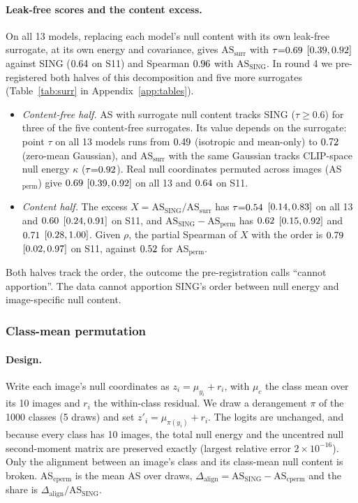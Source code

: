 \documentclass[10pt]{article}
\newcommand{\ASS}{\mathrm{AS}_{\mathrm{SING}}}
\newcommand{\ASsurr}{\mathrm{AS}_{\mathrm{surr}}}
\begin{document}
\paragraph{Leak-free scores and the content excess.}
On all 13 models, replacing each model's null content with its own leak-free surrogate, at its own energy and covariance, gives $\ASsurr$ with $\tau{=}0.69$ $[0.39,0.92]$ against SING ($0.64$ on S11) and Spearman $0.96$ with $\ASS$.
In round 4 we pre-registered both halves of this decomposition and five more surrogates (Table~\ref{tab:surr} in Appendix~\ref{app:tables}).
\begin{itemize}
\item \emph{Content-free half.} AS with surrogate null content tracks SING ($\tau\ge0.6$) for three of the five content-free surrogates. Its value depends on the surrogate: point $\tau$ on all 13 models runs from $0.49$ (isotropic and mean-only) to $0.72$ (zero-mean Gaussian), and $\ASsurr$ with the same Gaussian tracks CLIP-space null energy $\kappa$ ($\tau{=}0.92$). Real null coordinates permuted across images (AS$_{\mathrm{perm}}$) give $0.69$ $[0.39,0.92]$ on all 13 and $0.64$ on S11.
\item \emph{Content half.} The excess $X=\ASS/\ASsurr$ has $\tau{=}0.54$ $[0.14,0.83]$ on all 13 and $0.60$ $[0.24,0.91]$ on S11, and $\ASS-\mathrm{AS}_{\mathrm{perm}}$ has $0.62$ $[0.15,0.92]$ and $0.71$ $[0.28,1.00]$. Given $\rho$, the partial Spearman of $X$ with the order is $0.79$ $[0.02,0.97]$ on S11, against $0.52$ for AS$_{\mathrm{perm}}$.
\end{itemize}
Both halves track the order, the outcome the pre-registration calls ``cannot apportion''.
The data cannot apportion SING's order between null energy and image-specific null content.

\subsubsection{Class-mean permutation}
\label{sec:cperm}
\paragraph{Design.} Write each image's null coordinates as $z_i=\mu_{y_i}+r_i$, with $\mu_c$ the class mean over its 10 images and $r_i$ the within-class residual.
We draw a derangement $\pi$ of the 1000 classes (5 draws) and set $z'_i=\mu_{\pi(y_i)}+r_i$.
The logits are unchanged, and because every class has 10 images, the total null energy and the uncentred null second-moment matrix are preserved exactly (largest relative error $2{\times}10^{-16}$).
Only the alignment between an image's class and its class-mean null content is broken.
AS$_{\mathrm{cperm}}$ is the mean AS over draws, $\Delta_{\mathrm{align}}=\ASS-\mathrm{AS}_{\mathrm{cperm}}$ and the share is $\Delta_{\mathrm{align}}/\ASS$.
\end{document}

